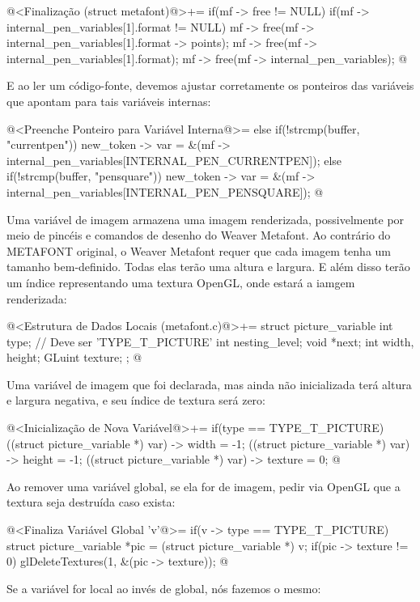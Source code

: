 \iniciocodigo
@<Finalização (struct metafont)@>+=
if(mf -> free != NULL){
  if(mf -> internal_pen_variables[1].format != NULL){
    mf -> free(mf -> internal_pen_variables[1].format -> points);
    mf -> free(mf -> internal_pen_variables[1].format);
  }
  mf -> free(mf -> internal_pen_variables);
}
@
\fimcodigo

E ao ler um código-fonte, devemos ajustar corretamente os ponteiros
das variáveis que apontam para tais variáveis internas:

\iniciocodigo
@<Preenche Ponteiro para Variável Interna@>=
else if(!strcmp(buffer, "currentpen"))
  new_token -> var =
          &(mf -> internal_pen_variables[INTERNAL_PEN_CURRENTPEN]);
else if(!strcmp(buffer, "pensquare"))
  new_token -> var =
          &(mf -> internal_pen_variables[INTERNAL_PEN_PENSQUARE]);
@
\fimcodigo


Uma variável de imagem armazena uma imagem renderizada, possivelmente
por meio de pincéis e comandos de desenho do Weaver Metafont. Ao
contrário do METAFONT original, o Weaver Metafont requer que cada
imagem tenha um tamanho bem-definido. Todas elas terão uma altura e
largura. E além disso terão um índice representando uma textura
OpenGL, onde estará a iamgem renderizada:

\iniciocodigo
@<Estrutura de Dados Locais (metafont.c)@>+=
struct picture_variable{
  int type; // Deve ser 'TYPE_T_PICTURE'
  int nesting_level;
  void *next;
  int width, height;
  GLuint texture;
};
@
\fimcodigo

Uma variável de imagem que foi declarada, mas ainda não inicializada
terá altura e largura negativa, e seu índice de textura será zero:

\iniciocodigo
@<Inicialização de Nova Variável@>+=
if(type == TYPE_T_PICTURE){
  ((struct picture_variable *) var) -> width = -1;
  ((struct picture_variable *) var) -> height = -1;
  ((struct picture_variable *) var) -> texture = 0;
}
@
\fimcodigo

Ao remover uma variável global, se ela for de imagem, pedir via OpenGL
que a textura seja destruída caso exista:

\iniciocodigo
@<Finaliza Variável Global 'v'@>=
if(v -> type == TYPE_T_PICTURE){
  struct picture_variable *pic = (struct picture_variable *) v;
  if(pic -> texture != 0)
    glDeleteTextures(1, &(pic -> texture));
}
@
\fimcodigo

Se a variável for local ao invés de global, nós fazemos o mesmo:

